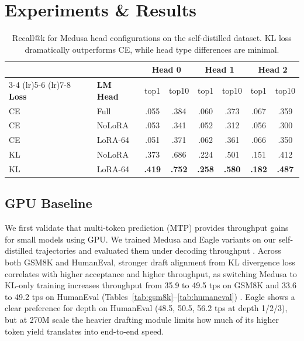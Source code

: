 \documentclass{article} %
\begin{document}
\section{Experiments \& Results}

\begin{table}[t]
\caption{Recall@k for Medusa head configurations on the self-distilled dataset. KL loss dramatically outperforms CE, while head type differences are minimal.}
\label{tab:head_recall}
\centering
\small
\begin{tabular}{llcccccc}
\toprule
& & \multicolumn{2}{c}{\textbf{Head 0}} & \multicolumn{2}{c}{\textbf{Head 1}} & \multicolumn{2}{c}{\textbf{Head 2}} \\
\cmidrule(lr){3-4} \cmidrule(lr){5-6} \cmidrule(lr){7-8}
\textbf{Loss} & \textbf{LM Head} & top1 & top10 & top1 & top10 & top1 & top10 \\
\midrule
CE & Full & .055 & .384 & .060 & .373 & .067 & .359 \\
CE & NoLoRA & .053 & .341 & .052 & .312 & .056 & .300 \\
CE & LoRA-64 & .051 & .371 & .062 & .361 & .066 & .350 \\
KL & NoLoRA & .373 & .686 & .224 & .501 & .151 & .412 \\
KL & LoRA-64 & \textbf{.419} & \textbf{.752} & \textbf{.258} & \textbf{.580} & \textbf{.182} & \textbf{.487} \\
\bottomrule
\end{tabular}
\end{table}

\subsection{GPU Baseline}

We first validate that multi-token prediction (MTP) provides throughput gains for small models using GPU. We trained Medusa and Eagle variants on our self-distilled trajectories and evaluated them under decoding throughput \citep{cai2024medusa, li2024eagle}. Across both GSM8K and HumanEval, stronger draft alignment from KL divergence loss correlates with higher acceptance and higher throughput, as switching Medusa to KL-only  training increases throughput from 35.9 to 49.5 tps on GSM8K and 33.6 to 49.2 tps on HumanEval (Tables~\ref{tab:gsm8k}--\ref{tab:humaneval}) \citep{cobbe2021gsm8k, chen2021humaneval}. Eagle shows a clear preference for depth on HumanEval (48.5, 50.5, 56.2 tps at depth 1/2/3), but at 270M scale the heavier drafting module limits how much of its higher token yield translates into end-to-end speed.
\end{document}

